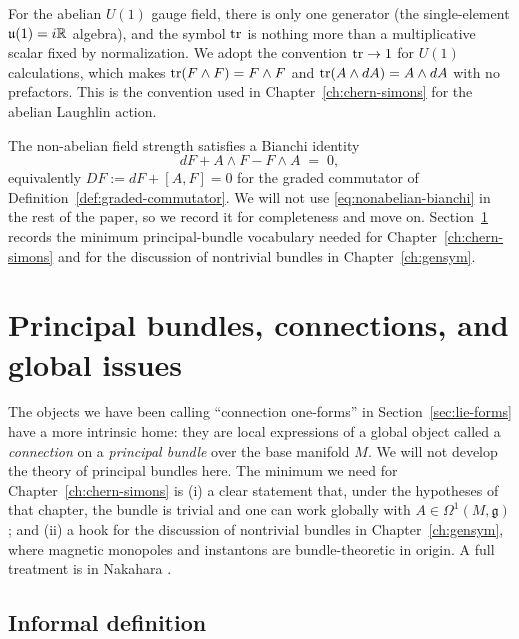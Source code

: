 \begin{remark}[Abelian $\tr$]\label{rem:abelian-trace}
For the abelian $U(1)$ gauge field, there is only one generator (the single-element $\mathfrak{u}(1) = i\mathbb{R}$ algebra), and the symbol $\tr$ is nothing more than a multiplicative scalar fixed by normalization. We adopt the convention $\operatorname{tr} \to 1$ for $U(1)$ calculations, which makes $\operatorname{tr}(F \wedge F) = F \wedge F$ and $\operatorname{tr}(A \wedge dA) = A \wedge dA$ with no prefactors. This is the convention used in Chapter~\ref{ch:chern-simons} for the abelian Laughlin action.
\end{remark}

\medskip

\noindent The non-abelian field strength satisfies a Bianchi identity
\begin{equation}\label{eq:nonabelian-bianchi}
dF + A \wedge F - F \wedge A \;=\; 0,
\end{equation}
equivalently $DF := dF + [A, F] = 0$ for the graded commutator of Definition~\ref{def:graded-commutator}. We will not use \eqref{eq:nonabelian-bianchi} in the rest of the paper, so we record it for completeness and move on. Section~\ref{sec:principal-bundles} records the minimum principal-bundle vocabulary needed for Chapter~\ref{ch:chern-simons} and for the discussion of nontrivial bundles in Chapter~\ref{ch:gensym}.


\section{Principal bundles, connections, and global issues}\label{sec:principal-bundles}

The objects we have been calling ``connection one-forms'' in Section~\ref{sec:lie-forms} have a more intrinsic home: they are local expressions of a global object called a \emph{connection} on a \emph{principal bundle} over the base manifold $M$. We will not develop the theory of principal bundles here. The minimum we need for Chapter~\ref{ch:chern-simons} is (i) a clear statement that, under the hypotheses of that chapter, the bundle is trivial and one can work globally with $A \in \Omega^1(M, \mathfrak{g})$; and (ii) a hook for the discussion of nontrivial bundles in Chapter~\ref{ch:gensym}, where magnetic monopoles and instantons are bundle-theoretic in origin. A full treatment is in Nakahara \cite{Nakahara2003GTP}.

\subsection{Informal definition}\label{sec:principal-bundle-def}

